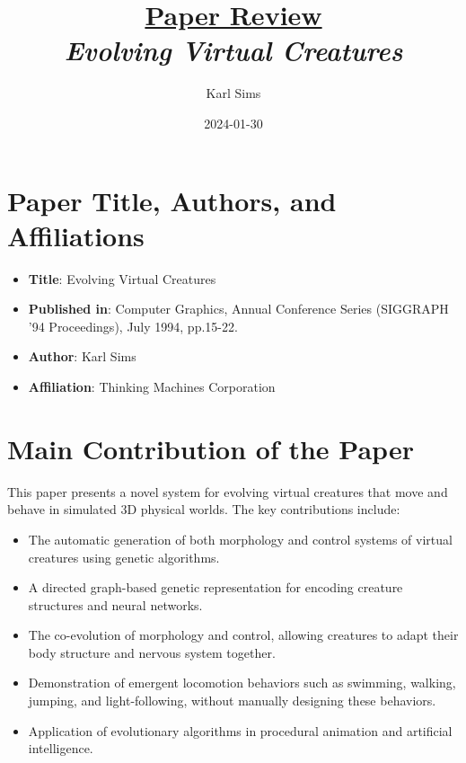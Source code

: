 \documentclass[12pt]{article}
\newcommand{\paperTitle}{
    \textit{\normalsize{Evolving Virtual Creatures}}
}
\begin{document}
\title{\Large\uline{\textbf{Paper Review}} \\[0.4em]
\paperTitle{} 
}
\author{Karl Sims}
\date{2024-01-30}

\maketitle

\section{Paper Title, Authors, and Affiliations}
\begin{itemize}[noitemsep]
    \item \textbf{Title}: Evolving Virtual Creatures
    \item \textbf{Published in}: Computer Graphics, Annual Conference Series (SIGGRAPH '94 Proceedings), July 1994, pp.15-22.
    \item \textbf{Author}: Karl Sims
    \item \textbf{Affiliation}: Thinking Machines Corporation
\end{itemize}

\section{Main Contribution of the Paper}
This paper presents a novel system for evolving virtual creatures that move and behave in simulated 3D physical worlds. The key contributions include:
\begin{itemize}[noitemsep]
    \item The automatic generation of both morphology and control systems of virtual creatures using genetic algorithms.
    \item A directed graph-based genetic representation for encoding creature structures and neural networks.
    \item The co-evolution of morphology and control, allowing creatures to adapt their body structure and nervous system together.
    \item Demonstration of emergent locomotion behaviors such as swimming, walking, jumping, and light-following, without manually designing these behaviors.
    \item Application of evolutionary algorithms in procedural animation and artificial intelligence.
\end{itemize}
\end{document}
